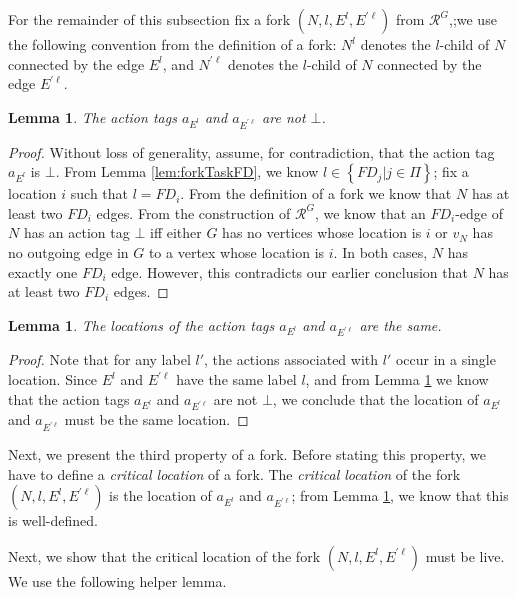 \documentclass[11pt]{article}
\numberwithin{theorem}{section}
\newtheorem{lemma}[theorem]{Lemma}
\newcommand{\set}[1]{\left\{#1\right\}}
\begin{document}
For the remainder of this subsection fix a fork $(N,l,E^l,E^{\prime \ell})$ from $\mathcal{R}^G$,;we use the following convention from the definition of a fork: $N^l$ denotes the $l$-child of $N$ connected by the edge $E^l$, and $N^{\prime \ell}$ denotes the $l$-child of $N$ connected by the edge $E^{\prime \ell}$.

\begin{lemma}\label{lem:forkEventTagsNotBot}
The action tags $a_{E^l}$ and $a_{E^{\prime \ell}}$ are not $\bot$.
\end{lemma}
\begin{proof}
Without loss of generality, assume, for contradiction, that the action tag $a_{E^l}$ is $\bot$. 
From Lemma \ref{lem:forkTaskFD}, we know $l \in \set{FD_j|j\in \Pi}$; fix a location $i$ such that $l = FD_i$. 
From the definition of a fork we know that $N$ has at least two $FD_i$ edges. 
From the construction of $\mathcal{R}^G$, we know that an $FD_i$-edge of $N$ has an action tag $\bot$ iff either $G$ has no vertices whose location is $i$ or $v_N$ has no outgoing edge in $G$ to a vertex whose location is $i$. In both cases, $N$ has exactly one $FD_i$ edge. However, this contradicts our earlier conclusion that $N$ has at least two $FD_i$ edges.
\end{proof}

\begin{lemma}\label{thm:forkSameCriticalProcess}
The locations of the action tags $a_{E^l}$ and $a_{E^{\prime \ell}}$ are the same.
\end{lemma}
\begin{proof}
Note that for any label $l'$, the actions associated with $l'$ occur in a single location. Since $E^l$ and $E^{\prime \ell}$ have the same label $l$, and from Lemma \ref{lem:forkEventTagsNotBot} we know that the action tags $a_{E^l}$ and $a_{E^{\prime \ell}}$ are not $\bot$, we conclude that the location of $a_{E^l}$ and $a_{E^{\prime \ell}}$ must be the same location.
\end{proof}

Next, we present the third property of a fork. Before stating this property, we have to define a \emph{critical location} of a fork. The \emph{critical location} of the fork $(N,l,E^l,E^{\prime \ell})$ is the location of $a_{E^l}$ and $a_{E^{\prime \ell}}$; from Lemma \ref{thm:forkSameCriticalProcess}, we know that this is well-defined.

Next, we show that the critical location of the fork $(N,l,E^l,E^{\prime \ell})$ must be live. We use the following helper lemma.
\end{document}
